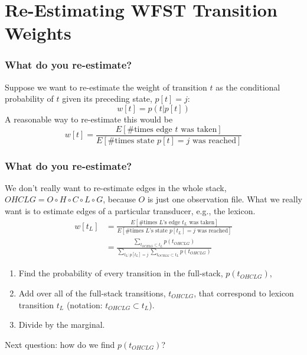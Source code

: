 \documentclass{beamer}
\begin{document}
\section[Re-Estimation]{Re-Estimating WFST Transition Weights}
\setcounter{subsection}{1}

\begin{frame}
  \frametitle{What do you re-estimate?}

  Suppose we want to re-estimate the weight of transition $t$ as the
  conditional probability of $t$ given its preceding state, $p[t]=j$:
  \begin{displaymath}
    w[t] = p(t|p[t])
  \end{displaymath}
  A reasonable way to re-estimate this would be
  \begin{displaymath}
    w[t] = \frac{E[\mbox{\# times edge $t$ was taken}]}{E[\mbox{\# times state $p[t]=j$ was reached}]}
  \end{displaymath}
\end{frame}
  
\begin{frame}
  \frametitle{What do you re-estimate?}


  We don't really want to re-estimate edges in the whole stack,
  $OHCLG=O\circ H\circ C\circ L\circ G$, because $O$ is just one
  observation file.
  What we really want is to estimate edges of a particular
  transducer, e.g., the lexicon.
  \begin{align*}
    w[t_L] &= \frac{E[\mbox{\# times $L$'s edge $t_L$ was taken}]}{E[\mbox{\# times $L$'s state $p[t_L]=j$ was reached}]}\\
    &=\frac{\sum_{t_{OCHLG}\subset t_L}p(t_{OHCLG})}{\sum_{t_L:p[t_L]=j}\sum_{t_{OCHLG}\subset t_L}p(t_{OHCLG})}
  \end{align*}
  \begin{enumerate}
    \item Find the probability of every transition in the full-stack, $p(t_{OHCLG})$,
    \item Add over all of the full-stack transitions, $t_{OHCLG}$, that correspond  to
      lexicon transition $t_L$ (notation: $t_{OHCLG}\subset t_L$).
    \item Divide by the marginal.
  \end{enumerate}
\end{frame}

\begin{frame}
  Next question: how do we find $p(t_{OHCLG})$?
\end{frame}
\end{document}
